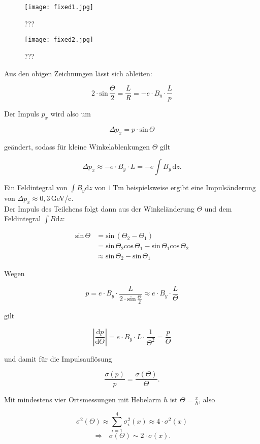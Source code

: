 \begin{figure}[H]
	\centering
	\texttt{[image: fixed1.jpg]}
	\caption{	 ???}
	\label{fixed1}
\end{figure}

\begin{figure}[H]
	\centering
	\texttt{[image: fixed2.jpg]}
	\caption{	 ???}
	\label{fixed2}
\end{figure}

Aus den obigen Zeichnungen lässt sich ableiten: 

\[ 2\cdot \text{sin}\,\frac{\Theta}{2} = \frac{L}{R} = -e\cdot B_y\cdot \frac{L}{p} \]

Der Impuls $p_x$ wird also um 

\[ \Delta p_x = p\cdot \text{sin}\,\Theta \]

geändert, sodass für kleine Winkelablenkungen $\Theta$ gilt

\[ \Delta p_x \approx -e\cdot B_y\cdot L = -e \int B_y \,\mathrm{d}z.\]

Ein Feldintegral von $\int B_y \mathrm{d}z$ von $1\,$Tm beispielsweise ergibt eine Impulsänderung
von $\Delta p_x \approx 0{,}3\,$GeV/c.
\\
Der Impuls des Teilchens folgt dann aus der Winkeländerung $\Theta$ und dem Feldintegral $\int B
\mathrm{d}z$:

\begin{align*}
\text{sin}\,\Theta &= \text{sin}\,(\Theta_2-\Theta_1) \\
&= \text{sin}\,\Theta_2\text{cos}\,\Theta_1-\text{sin}\,\Theta_1\text{cos}\,\Theta_2 \\
&\approx \text{sin}\,\Theta_2-\text{sin}\,\Theta_1
\end{align*}


Wegen

\[p=e\cdot B_y\cdot \frac{L}{2\cdot \text{sin}\,\frac{\Theta}{2}} \approx e\cdot B_y\cdot
\frac{L}{\Theta}
\]

gilt

\[ \left| \frac{\mathrm{d}p}{\mathrm{d}\Theta} \right| =e\cdot B_y\cdot L \cdot \frac{1}{\Theta^2} =
\frac{p}{\Theta} \]

und damit für die Impulsauflösung

\[ \frac{\sigma(p)}{p}  = \frac{\sigma(\Theta)}{\Theta}. \]

Mit mindestens vier Ortsmessungen mit Hebelarm $h$ ist $\Theta=\frac{x}{h}$, also

\[\sigma^2(\Theta) \approx \sum_{i=1}^4 \sigma_i^2(x) \approx 4\cdot \sigma^2(x)  \]
\[\Rightarrow~~~ \sigma(\Theta) \sim 2\cdot\sigma(x). \]

